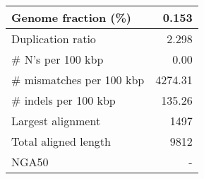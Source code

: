 \documentclass[12pt,a4paper]{article}
\begin{document}
\begin{table}[ht]
\begin{center}
\begin{tabular}{|l*{1}{|r}|}
Genome fraction (\%) & 0.153 \\ \hline
Duplication ratio & 2.298 \\ \hline
\# N's per 100 kbp & 0.00 \\ \hline
\# mismatches per 100 kbp & 4274.31 \\ \hline
\# indels per 100 kbp & 135.26 \\ \hline
Largest alignment & 1497 \\ \hline
Total aligned length & 9812 \\ \hline
NGA50 & - \\ \hline
\end{tabular}
\end{center}
\end{table}
\end{document}
